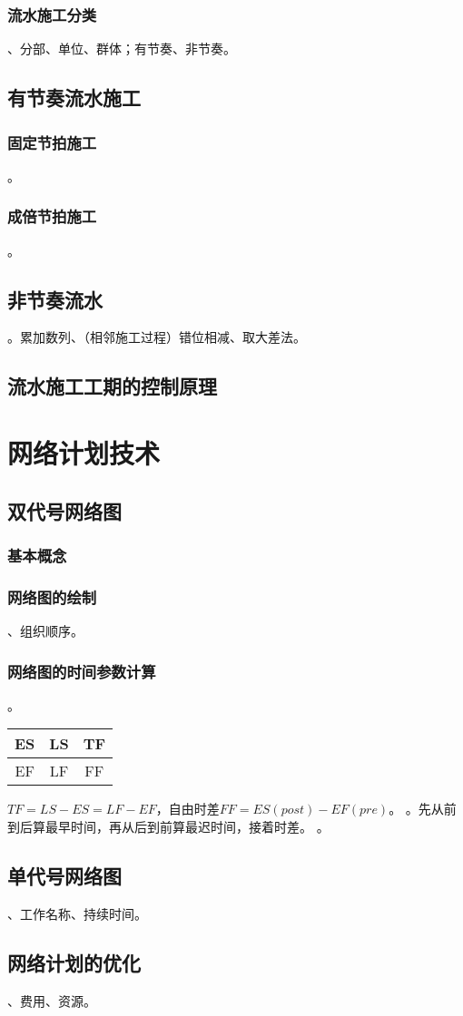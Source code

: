 \documentclass{book}
\begin{document}
\subsection{流水施工分类}
、分部、单位、群体；有节奏、非节奏。
\section{有节奏流水施工}
\subsection{固定节拍施工}
。
\subsection{成倍节拍施工}
。
\section{非节奏流水}
。累加数列、（相邻施工过程）错位相减、取大差法。
\section{流水施工工期的控制原理}
\chapter{网络计划技术}
\section{双代号网络图}
\subsection{基本概念}
\subsection{网络图的绘制}
、组织顺序。
\subsection{网络图的时间参数计算}
。
\begin{table}
    \begin{center}
        \begin{tabular}{c|c|c}
            ES & LS & TF \\
            \hline
            EF & LF & FF
        \end{tabular}
    \end{center}
\end{table}
$TF=LS-ES=LF-EF$，自由时差$FF=ES(post)-EF(pre)$。
。先从前到后算最早时间，再从后到前算最迟时间，接着时差。
。
\section{单代号网络图}
、工作名称、持续时间。
\section{网络计划的优化}
、费用、资源。
\appendix   
\end{document}
